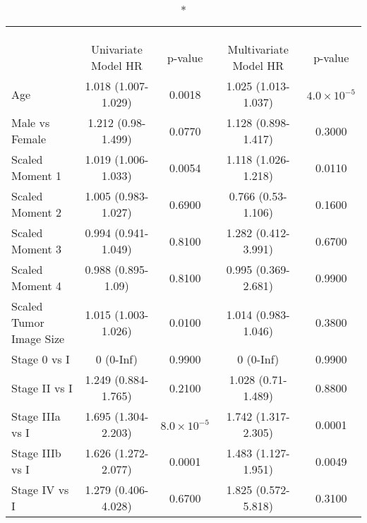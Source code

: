 \captionsetup[table]{labelformat=empty,skip=1pt}
\begin{longtable}{lcccc}
\caption*{
\large Cox Proportional Hazard Model\\ 
\small \\ 
} \\ 
\toprule
 & Univariate Model HR & p-value & Multivariate Model HR & p-value \\ 
\midrule
Age & 1.018 (1.007-1.029) & 0.0018 & 1.025 (1.013-1.037) & $4.0 \times 10^{-5}$ \\ 
Male vs Female & 1.212 (0.98-1.499) & 0.0770 & 1.128 (0.898-1.417) & 0.3000 \\ 
Scaled Moment 1 & 1.019 (1.006-1.033) & 0.0054 & 1.118 (1.026-1.218) & 0.0110 \\ 
Scaled Moment 2 & 1.005 (0.983-1.027) & 0.6900 & 0.766 (0.53-1.106) & 0.1600 \\ 
Scaled Moment 3 & 0.994 (0.941-1.049) & 0.8100 & 1.282 (0.412-3.991) & 0.6700 \\ 
Scaled Moment 4 & 0.988 (0.895-1.09) & 0.8100 & 0.995 (0.369-2.681) & 0.9900 \\ 
Scaled Tumor Image Size & 1.015 (1.003-1.026) & 0.0100 & 1.014 (0.983-1.046) & 0.3800 \\ 
Stage 0 vs I & 0 (0-Inf) & 0.9900 & 0 (0-Inf) & 0.9900 \\ 
Stage II vs I & 1.249 (0.884-1.765) & 0.2100 & 1.028 (0.71-1.489) & 0.8800 \\ 
Stage IIIa vs I & 1.695 (1.304-2.203) & $8.0 \times 10^{-5}$ & 1.742 (1.317-2.305) & 0.0001 \\ 
Stage IIIb vs I & 1.626 (1.272-2.077) & 0.0001 & 1.483 (1.127-1.951) & 0.0049 \\ 
Stage IV vs I & 1.279 (0.406-4.028) & 0.6700 & 1.825 (0.572-5.818) & 0.3100 \\ 
\bottomrule
\end{longtable}

